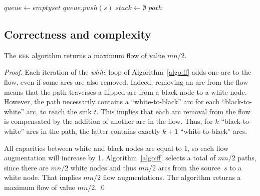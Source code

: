 \documentclass[svgnames,table,runningheads]{llncs}
\newcommand{\rek}{\textsc{rek}\xspace}
\begin{document}
\begin{algorithm}[t]
  \DontPrintSemicolon

  $queue \gets emptyset$\;
  $queue.push(s)$\;
  $stack \gets \emptyset$\;
  \Return $path$\;
  \caption{make\_path}\label{algo:path} 
\end{algorithm}

\subsection{Correctness and complexity}

\begin{proposition}\label{prop:return}
  The \rek algorithm returns a maximum flow of value $mn/2$.
\end{proposition}
\begin{proof}
  Each iteration of the {\it while} loop of Algorithm~\ref{algo:ff} adds one arc to the flow, even if some arcs are also removed. Indeed, removing an arc from the flow means that the path traverses a flipped arc from a black node to a white node. However, the path necessarily contains a ``white-to-black'' arc for each ``black-to-white'' arc, to reach the sink \(t\). This implies that each arc removal from the flow is compensated by the addition of another arc in the flow. Thus, for \(k\) ``black-to-white'' arcs in the path, the latter contains exactly \(k+1\) ``white-to-black'' arcs.

  All capacities between white and black nodes are equal to 1, so each flow augmentation will increase by 1. Algorithm~\ref{algo:ff} selects a total of $mn/2$ paths, since there are $mn/2$ white nodes and thus $mn/2$ arcs from the source~\(s\) to a white node. That implies $mn/2$ flow augmentations. The algorithm returns a maximum flow of value $mn/2$. \qed
\end{proof}
\end{document}
